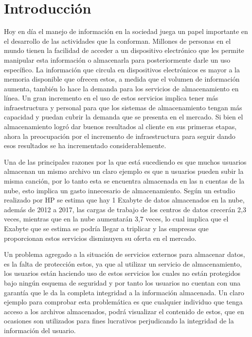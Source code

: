 \chapter{Introducci\'on} %
\label{cha:introduccion}
Hoy en día el manejo de información en la sociedad juega un papel importante en el desarrollo de las actividades que la conforman. Millones de personas en el mundo tienen la facilidad de acceder a un dispositivo electrónico que les permite manipular esta información o almacenarla para posteriormente darle un uso específico. La información que circula en dispositivos electrónicos es mayor a la memoria disponible que ofrecen estos, a medida que el volumen de información aumenta, también lo hace la demanda para los servicios de almacenamiento en línea. Un gran incremento en el uso de estos servicios implica tener más infraestructura y personal para que los sistemas de almacenamiento tengan más capacidad y puedan cubrir la demanda que se presenta en el mercado. Si bien el almacenamiento logró dar buenos resultados al cliente en sus primeras etapas, ahora la preocupación por el incremento de infraestructura para seguir dando esos resultados se ha incrementado considerablemente. ~\cite{Bellare} ~\cite{Keelveedhi}

Una de las principales razones por la que está sucediendo es que muchos usuarios almacenan un mismo archivo un claro ejemplo es que n usuarios pueden subir la misma canción, por lo tanto esta se encuentra almacenada en las n cuentas de la nube, esto implica un gasto innecesario de almacenamiento. Según un estudio realizado por HP se estima que hay 1 Exabyte de datos almacenados en la nube, además de 2012 a 2017, las cargas de trabajo de los centros de datos crecerán 2,3 veces, mientras que en la nube aumentarán 3,7 veces, lo cual implica que el Exabyte que se estima se podría llegar a triplicar y las empresas que proporcionan estos servicios disminuyen su oferta en el mercado. ~\cite{popa}

Un problema agregado a la situación de servicios externos para almacenar datos, es la falta de protección estos, ya que al utilizar un servicio de almacenamiento, los usuarios están haciendo uso de estos servicios los cuales no están protegidos bajo ningún esquema de seguridad y por tanto los usuarios no cuentan con una garantía que le da la completa integridad a la información almacenada. Un claro ejemplo para comprobar esta problemática es que cualquier individuo que tenga acceso a los archivos almacenados, podrá visualizar el contenido de estos, que en ocasiones son utilizados para fines lucrativos perjudicando la integridad de la información del usuario.

